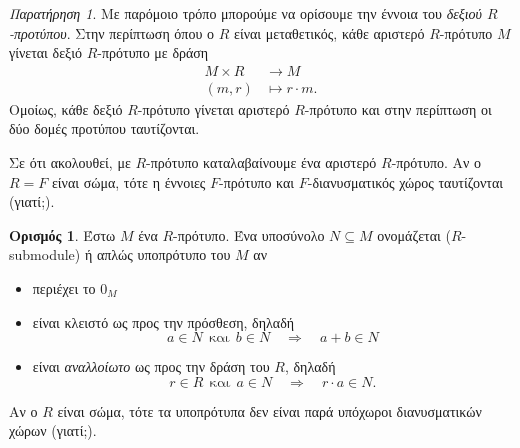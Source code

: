 \documentclass[12pt,a4paper,reqno]{amsart}
\theoremstyle{definition}
\newtheorem{definition}[theorem]{Ορισμός}
\theoremstyle{remark}
\newtheorem*{remark}{Παρατήρηση}
\numberwithin{theorem}{section}
\numberwithin{exercise}{section}
\numberwithin{equation}{section}
\renewcommand{\to}{\rightarrow}
\newcommand{\then}{\Rightarrow}
\newcommand{\defn}[1]{{\color{mylightblue}{#1}}}
\begin{document}
\begin{remark}
    Με παρόμοιο τρόπο μπορούμε να ορίσουμε την έννοια του \emph{δεξιού $R$-προτύπου}. Στην περίπτωση όπου ο $R$ είναι μεταθετικός, κάθε αριστερό $R$-πρότυπο $M$ γίνεται δεξιό $R$-πρότυπο με δράση 
    \begin{align*}
        M \times R &\to M \\ 
             (m,r) &\mapsto r\cdot{m}.
    \end{align*}
    Ομοίως, κάθε δεξιό $R$-πρότυπο γίνεται αριστερό $R$-πρότυπο και στην περίπτωση οι δύο δομές προτύπου ταυτίζονται.
\end{remark}

Σε ότι ακολουθεί, με $R$-πρότυπο καταλαβαίνουμε ένα αριστερό $R$-πρότυπο. Αν ο $R = F$ είναι σώμα, τότε η έννοιες $F$-πρότυπο και $F$-διανυσματικός χώρος ταυτίζονται (γιατί;).

\begin{definition}
    \label{def:submodule}
    Έστω $M$ ένα $R$-πρότυπο. Ένα υποσύνολο $N \subseteq M$ ονομάζεται \defn{$R$-υποπρότυπο} ($R$-submodule) ή απλώς υποπρότυπο του $M$ αν 
    \begin{itemize}
        \item περιέχει το $0_M$
        \item είναι κλειστό ως προς την πρόσθεση, δηλαδή 
        \[
        a \in N \ \ \text{και} \ \ b \in N \quad \then \quad a+b \in N
        \]
        \item  είναι \emph{αναλλοίωτο} ως προς την δράση του $R$, δηλαδή 
        \[
        r \in R \ \ \text{και} \ \ a \in N \quad \then \quad r\cdot{a} \in N.
        \]
    \end{itemize}
\end{definition}

Αν ο $R$ είναι σώμα, τότε τα υποπρότυπα δεν είναι παρά υπόχωροι διανυσματικών χώρων (γιατί;).
\end{document}
